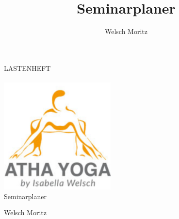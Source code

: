 \documentclass[minted, notitle]{protocol}
\title{Seminarplaner}
\author{Welsch Moritz}
\begin{document}
\begin{titlepage} %
	\raggedleft %
	
	\begingroup \color{gray}{\rule{3pt}{\textheight}} \endgroup %
	\hspace{0.05\textwidth} %
	\parbox[b]{0.75\textwidth}{ %
		{{\fontsize{27}{48} \selectfont  LASTENHEFT}} \\	\vspace{0.284\textheight} \\
		
		{\includegraphics[width=220]{images/Logo_1.png}} \\[2\baselineskip]
		{{\fontsize{20}{48} \selectfont Seminarplaner}} \\ %
		{\vspace{-0.5cm}\large \begin{flushleft} Welsch Moritz\end{flushleft}}\\ [1\baselineskip] %
		
}
\end{titlepage}
\end{document}
